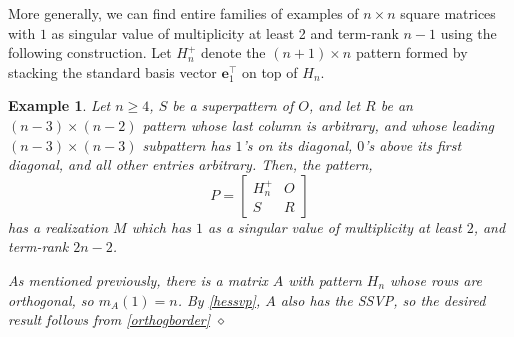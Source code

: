 \documentclass[preprint,12pt]{elsarticle}
\newcommand{\trans  }{^\top}
\newtheorem{Example}[theorem]{Example}
\begin{document}
More generally, we can find entire families of examples of $n \times n$ square matrices with $1$ as singular value of multiplicity at least 2 and term-rank $n-1$ using the following construction. Let $H_n^+$ denote the $(n+1) \times n$ pattern formed by stacking the standard basis vector $\mathbf{e}\trans_1$ on top of  $H_n$.

\begin{Example}
\rm
Let $n \geq 4$, $S$ be a superpattern of $O$, and let $R$ be an $(n-3) \times (n-2)$ pattern whose last column is arbitrary, and whose leading $(n-3) \times (n-3)$ subpattern has $1$'s on its diagonal, $0$'s above its first diagonal, and all other entries arbitrary. Then, the pattern,
    \[ P = 
\left[ 
\begin{array}{c|c}
    H^+_{n} & O\\
    \hline
    S& R
\end{array}
\right]
    \]
    has a realization $M$ which has $1$ as a singular value of multiplicity at least $2$, and term-rank $2n-2$. 

   As mentioned previously, there is a matrix $A$ with pattern $H_n$ whose rows are orthogonal, so $m_A(1) = n$. By \cref{hessvp}, $A$ also has the SSVP, so the desired result follows from \cref{orthogborder}
\hfill $\diamond$  \end{Example}


 

\end{document}
